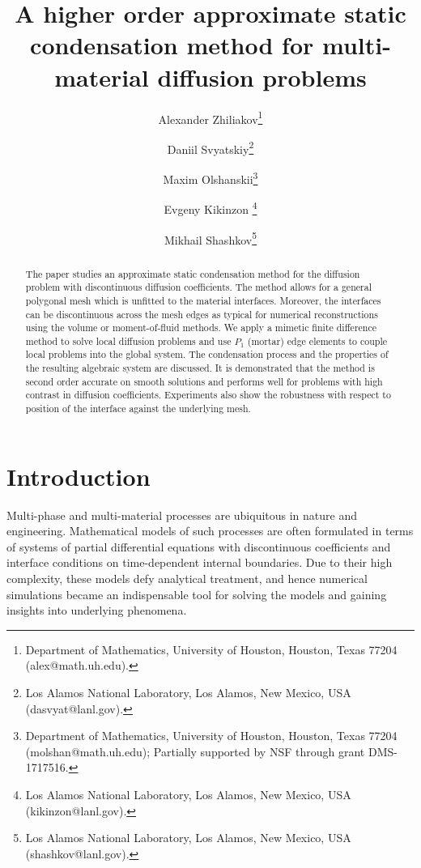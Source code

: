 \documentclass[12pt]{article}
\title{A higher order approximate static condensation method for multi-material diffusion problems}
\author{
	Alexander Zhiliakov\thanks{Department of Mathematics, University of Houston, Houston, Texas 77204 (alex@math.uh.edu).}
	\and Daniil Svyatskiy\thanks{Los Alamos National Laboratory, Los Alamos,
		New Mexico, USA (dasvyat@lanl.gov).}
	\and
	Maxim Olshanskii\thanks{Department of Mathematics, University of Houston, Houston, Texas 77204 (molshan@math.uh.edu); Partially supported by NSF through grant  DMS-1717516.}
	\and Evgeny Kikinzon \thanks{Los Alamos National Laboratory, Los Alamos,
		New Mexico, USA (kikinzon@lanl.gov).}
	\and Mikhail Shashkov\thanks{Los Alamos National Laboratory, Los Alamos,
		New Mexico, USA (shashkov@lanl.gov).}
}
\newcommand{\Sasha}[1]{\colorbox{Cyan}{\textbf{Sasha}:} #1}
\begin{document}
	
	\maketitle
	
	\let\oldtabular\tabular
	\renewcommand{\tabular}[1][1.5]{\def\arraystretch{#1}\oldtabular}
	
	
	\begin{abstract}
		The paper studies an approximate static condensation method for the diffusion problem with discontinuous diffusion coefficients. The method allows for a general polygonal mesh which is unfitted to the material interfaces. Moreover, the interfaces can be discontinuous across the mesh edges as typical for numerical reconstructions using the volume or moment-of-fluid methods.  We apply a mimetic finite difference method to solve local diffusion problems and use $P_1$ (mortar) edge elements to couple local problems into the global system. The condensation process and the properties of the resulting algebraic system are discussed. It is demonstrated that the method is second order accurate on smooth solutions and performs well for problems with high contrast in diffusion coefficients. Experiments also show the robustness with respect to position of the interface against the underlying mesh.
	\end{abstract}
	
	
	\section{Introduction}
	
	Multi-phase and multi-material processes are ubiquitous in nature and engineering.
	Mathematical models of such processes are often formulated in terms of systems of partial differential equations with discontinuous coefficients and interface conditions on time-dependent internal boundaries.
	Due to their high complexity, these models defy analytical treatment, and hence numerical simulations became an indispensable tool for solving the models and gaining insights into underlying phenomena.
	
\end{document}
